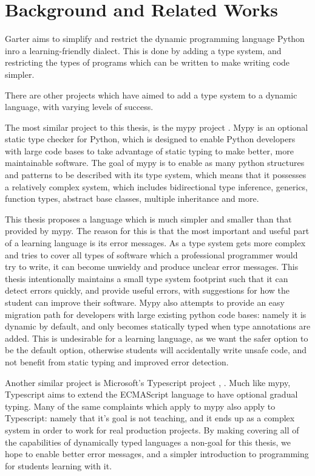 \glsresetall %
\chapter{Background and Related Works}\label{ch:Background}

Garter aims to simplify and restrict the dynamic programming language Python
inro a learning-friendly dialect. This is done by adding a type system, and
restricting the types of programs which can be written to make writing code simpler.

There are other projects which have aimed to add a type system to a dynamic
language, with varying levels of success. 

The most similar project to this thesis, is the mypy project \cite{mypyweb}.
Mypy is an optional static type checker for Python, which is designed to enable
Python developers with large code bases to take advantage of static typing to
make better, more maintainable software. The goal of mypy is to enable as many
python structures and patterns to be described with its type system, which means
that it possesses a relatively complex system, which includes bidirectional type
inference, generics, function types, abstract base classes, multiple inheritance
and more.

This thesis proposes a language which is much simpler and smaller than that
provided by mypy. The reason for this is that the most important and useful part
of a learning language is its error messages. As a type system gets more complex
and tries to cover all types of software which a professional programmer would
try to write, it can become unwieldy and produce unclear error messages. This
thesis intentionally maintains a small type system footprint such that it can
detect errors quickly, and provide useful errors, with suggestions for how the
student can improve their software. Mypy also attempts to provide an easy
migration path for developers with large existing python code bases: namely it
is dynamic by default, and only becomes statically typed when type annotations
are added. This is undesirable for a learning language, as we want the safer
option to be the default option, otherwise students will accidentally write
unsafe code, and not benefit from static typing and improved error detection.

Another similar project is Microsoft's Typescript
project \cite{typescriptpaper}, \cite{typescriptweb}. Much like mypy, Typescript
aims to extend the ECMAScript language \cite{ecmascript} to have optional
gradual typing. Many of the same complaints which apply to mypy also apply to
Typescript: namely that it's goal is not teaching, and it ends up as a complex
system in order to work for real production projects. By making covering all of
the capabilities of dynamically typed languages a non-goal for this thesis, we
hope to enable better error messages, and a simpler introduction to programming
for students learning with it.

